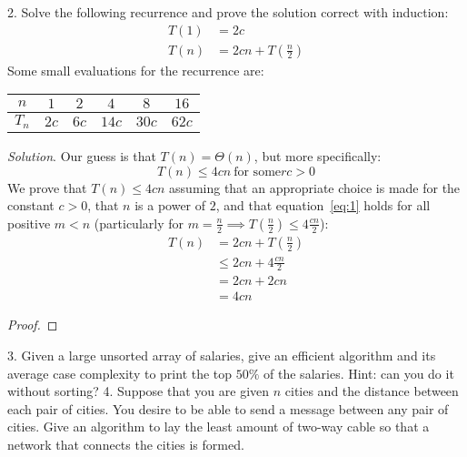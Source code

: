 \documentclass{scrartcl}
\begin{document}
\begin{flushleft}
    2. Solve the following recurrence and prove the solution correct with induction:
    \begin{align*}
        T(1) &= 2c\\
        T(n) &= 2cn + T(\frac{n}{2})
    \end{align*}
    Some small evaluations for the recurrence are:
    \medskip
    \begin{center}
        \begin{tabular}{|c|c|c|c|c|c|}
            \hline
            $n$ & $1$ & $2$ & $4$ & $8$ & $16$\\
            \hline
            $T_n$ & $2c$ & $6c$ & $14c$ & $30c$ & $62c$\\
            \hline
        \end{tabular}
    \end{center}
    \medskip
    \textit{Solution}. Our guess is that $T(n) = \Theta(n)$, but more specifically:
    \begin{equation}
        T(n) \leq 4cn\ \text{for some}r c > 0
        \label{eq:1}
    \end{equation}
    We prove that $T(n) \leq 4cn$ assuming that an appropriate choice is made for the constant $c >
    0$, that $n$ is a power of $2$, and that equation~\ref{eq:1} holds for all positive $m < n$
    (particularly for $m = \frac{n}{2} \implies T(\frac{n}{2}) \leq 4\frac{cn}{2}$):
    \begin{align*}
        T(n) &= 2cn + T(\frac{n}{2})\\
        &\leq 2cn + 4\frac{cn}{2}\\
        &= 2cn + 2cn\\
        &= 4cn
    \end{align*}
    \begin{proof}
    \end{proof}
    \newpage
    3. Given a large unsorted array of salaries, give an efficient algorithm and its average case
    complexity to print the top $50\%$ of the salaries. Hint: can you do it without sorting?
    \newpage
    4. Suppose that you are given $n$ cities and the distance between each pair of cities. You
    desire to be able to send a message between any pair of cities. Give an algorithm to lay the
    least amount of two-way cable so that a network that connects the cities is formed.

\end{flushleft}
\end{document}

